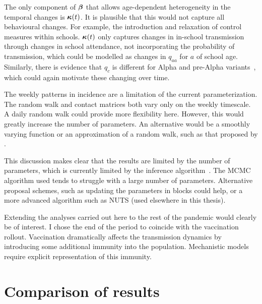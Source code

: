 \documentclass[thesis.tex]{subfiles}
\begin{document}
The only component of $\bm{\beta}$ that allows age-dependent heterogeneity in the temporal changes is $\bm{\kappa}(t)$.
It is plausible that this would not capture all behavioural changes.
For example, the introduction and relaxation of control measures within schools.
$\bm{\kappa}(t)$ only captures changes in in-school transmission through changes in school attendance, not incorporating the probability of transmission, which could be modelled as changes in $q_{aa}$ for $a$ of school age.
Similarly, there is evidence that $q_c$ is different for Alpha and pre-Alpha variants~\autocite{zhuRole}, which could again motivate these changing over time.

The weekly patterns in incidence are a limitation of the current parameterization.
The random walk and contact matrices both vary only on the weekly timescale.
A daily random walk could provide more flexibility here.
However, this would greatly increase the number of parameters.
An alternative would be a smoothly varying function or an approximation of a random walk, such as that proposed by \textcite{ghoshApproximate}.

This discussion makes clear that the results are limited by the number of parameters, which is currently limited by the inference algorithm~.
The MCMC algorithm used tends to struggle with a large number of parameters.
Alternative proposal schemes, such as updating the parameters in blocks could help, or a more advanced algorithm such as NUTS (used elsewhere in this thesis).

Extending the analyses carried out here to the rest of the pandemic would clearly be of interest.
I chose the end of the period to coincide with the vaccination rollout.
Vaccination dramatically affects the transmission dynamics by introducing some additional immunity into the population.
Mechanistic models require explicit representation of this immunity.

\section{Comparison of results} \label{transmission:sec:comparison}
\end{document}
